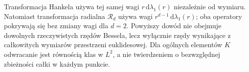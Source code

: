 \begin{uwaga}
Transformacja Hankela używa tej samej wagi
$r\,\mathrm d\lambda_1(r)$ niezależnie od wymiaru.
Natomiast transformacja radialna $\mathcal R_d$ używa
wagi $r^{d-1}\,\mathrm d\lambda_1(r)$; oba operatory
pokrywają się bez zmiany wagi dla $d=2$.
Powyższy dowód nie obejmuje dowolnych rzeczywistych
rzędów Bessela, lecz wyłącznie rzędy wynikające
z całkowitych wymiarów przestrzeni euklidesowej.
Dla ogólnych elementów $K$ odwracanie jest równością
klas w $L^2$, a nie twierdzeniem o bezwzględnej
zbieżności całki w każdym punkcie.
\end{uwaga}
